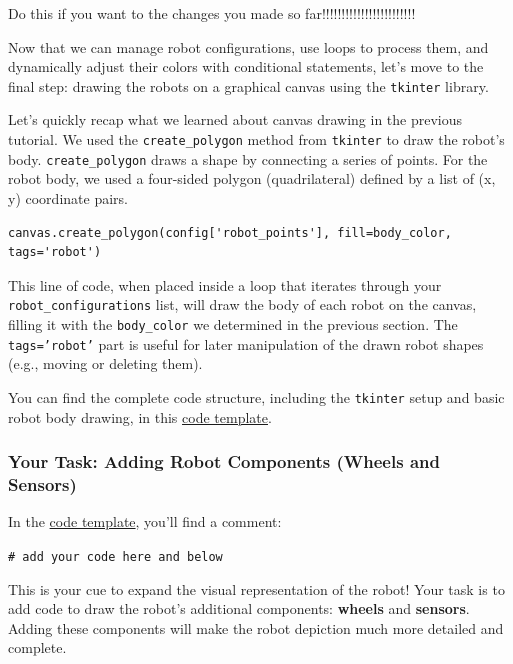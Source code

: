 Do this if you want to the changes you made so far!!!!!!!!!!!!!!!!!!!!!!!!

Now that we can manage robot configurations, use loops to process them, and dynamically adjust their colors with conditional statements, let's move to the final step: drawing the robots on a graphical canvas using the \texttt{tkinter} library.

Let's quickly recap what we learned about canvas drawing in the previous tutorial. We used the \texttt{create\_polygon} method from \texttt{tkinter} to draw the robot's body. \texttt{create\_polygon} draws a shape by connecting a series of points. For the robot body, we used a four-sided polygon (quadrilateral) defined by a list of (x, y) coordinate pairs.

\begin{verbatim}
canvas.create_polygon(config['robot_points'], fill=body_color, tags='robot')
\end{verbatim}

This line of code, when placed inside a loop that iterates through your \texttt{robot\_configurations} list, will draw the body of each robot on the canvas, filling it with the \texttt{body\_color} we determined in the previous section. The \texttt{tags='robot'} part is useful for later manipulation of the drawn robot shapes (e.g., moving or deleting them).

You can find the complete code structure, including the \texttt{tkinter} setup and basic robot body drawing, in this \href{https://github.com/balandongiv/computer_programming_gist/blob/main/session3/tkinter_robot_template.py}{code template}.

\subsubsection{Your Task: Adding Robot Components (Wheels and Sensors)}

In the \href{https://github.com/balandongiv/computer_programming_gist/blob/main/session3/tkinter_robot_template.py}{code template}, you'll find a comment:



\texttt{\# add your code here and below}

This is your cue to expand the visual representation of the robot! Your task is to add code to draw the robot's additional components: \textbf{wheels} and \textbf{sensors}. Adding these components will make the robot depiction much more detailed and complete.

